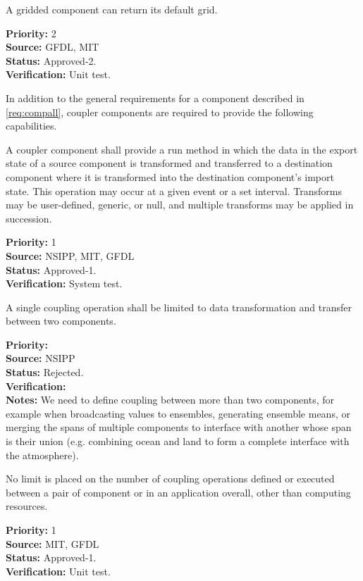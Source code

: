 A gridded component can return its default grid.
\begin{reqlist}
{\bf Priority:} 2\\
{\bf Source:} GFDL, MIT\\
{\bf Status:} Approved-2.\\
{\bf Verification:} Unit test.
\end{reqlist}


In addition to the general requirements for a component described in 
\ref{req:compall}, coupler components are required to provide the
following capabilities.

A coupler component shall provide a run method in which the data in the
export state of a source component is transformed and 
transferred to a destination component where it is transformed 
into the destination component's import state.  This operation 
may occur at a given event or a set interval.  Transforms may be 
user-defined, generic, or null, and multiple transforms may be applied 
in succession.
\begin{reqlist}
{\bf Priority:} 1\\ 
{\bf Source:} NSIPP, MIT, GFDL \\
{\bf Status:} Approved-1.\\
{\bf Verification:} System test.
\end{reqlist}

A single coupling operation shall be limited to data transformation and
transfer between two components.
\begin{reqlist}
{\bf Priority:} \\ 
{\bf Source:} NSIPP \\
{\bf Status:} Rejected.\\
{\bf Verification:} \\
{\bf Notes:} We need to define coupling between more than two 
components, for example when broadcasting values to ensembles,
generating ensemble means, or merging the spans of multiple components
to interface with another whose span is their union (e.g. 
combining ocean and land to form a complete interface with the 
atmosphere).
\end{reqlist}

No limit is placed on the number of coupling operations defined or
executed between a pair of component or in an application overall, 
other than computing resources.
\begin{reqlist}
{\bf Priority:} 1\\ 
{\bf Source:} MIT, GFDL \\
{\bf Status:} Approved-1.\\
{\bf Verification:} Unit test.\\
\end{reqlist}

